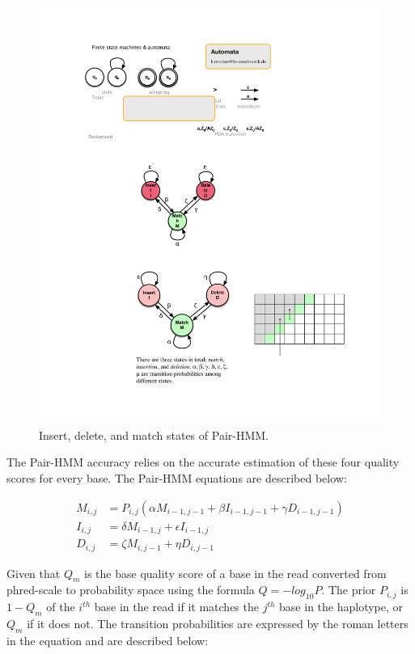 \begin{figure}[htbp]
\centering
\includegraphics[scale=0.52]{fig/algo-pair-hmm.pdf}
\caption{Insert, delete, and match states of Pair-HMM.}
\label{fig:arch_design}
\end{figure}

The Pair-HMM accuracy relies on the accurate estimation of these four quality scores for every base. The Pair-HMM equations are described below:

\begin{align}
    M_{i,j} &= P_{i,j} (\alpha  M_{i-1,j-1} + \beta  I_{i-1,j-1} + \gamma D_{i-1,j-1} ) \\
    I_{i,j} &= \delta  M_{i-1,j} + \epsilon  I_{i-1,j} \\
    D_{i,j} &= \zeta   M_{i,j-1} + \eta  D_{i,j-1} 
\end{align}

Given that $Q_m$ is the base quality score of a base in the read converted from phred-scale to probability space using the formula $Q = -log_{10}P$. The prior $P_{i,j}$ is $1-Q_m$ of the $i^{th}$ base in the read if it matches the $j^{th}$ base in the haplotype, or $Q_m$ if it does not.  The transition probabilities are expressed by the roman letters in the equation and are described below: 

